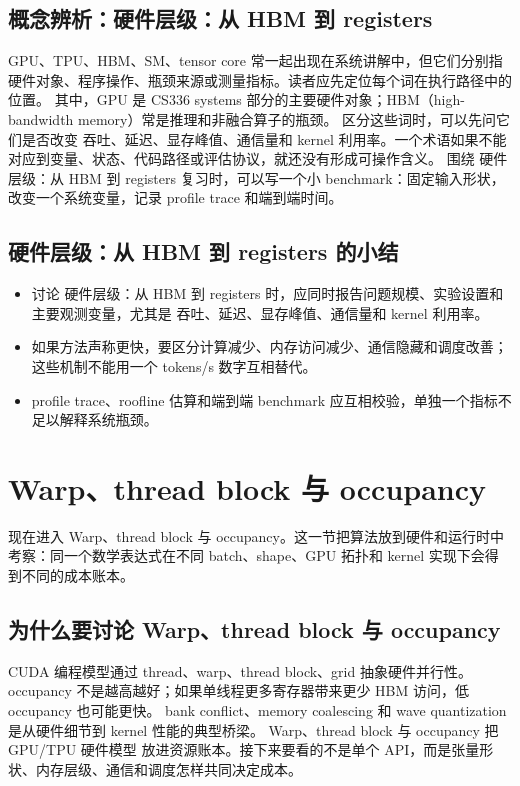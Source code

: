 \documentclass[a4paper]{article}
\begin{document}
\subsection{概念辨析：硬件层级：从 HBM 到 registers}
GPU、TPU、HBM、SM、tensor core 常一起出现在系统讲解中，但它们分别指硬件对象、程序操作、瓶颈来源或测量指标。读者应先定位每个词在执行路径中的位置。
其中，GPU 是 CS336 systems 部分的主要硬件对象；HBM（high-bandwidth memory）常是推理和非融合算子的瓶颈。
区分这些词时，可以先问它们是否改变 吞吐、延迟、显存峰值、通信量和 kernel 利用率。一个术语如果不能对应到变量、状态、代码路径或评估协议，就还没有形成可操作含义。
围绕 硬件层级：从 HBM 到 registers 复习时，可以写一个小 benchmark：固定输入形状，改变一个系统变量，记录 profile trace 和端到端时间。
\subsection{硬件层级：从 HBM 到 registers 的小结}
\begin{itemize}
\item 讨论 硬件层级：从 HBM 到 registers 时，应同时报告问题规模、实验设置和主要观测变量，尤其是 吞吐、延迟、显存峰值、通信量和 kernel 利用率。
\item 如果方法声称更快，要区分计算减少、内存访问减少、通信隐藏和调度改善；这些机制不能用一个 tokens/s 数字互相替代。
\item profile trace、roofline 估算和端到端 benchmark 应互相校验，单独一个指标不足以解释系统瓶颈。
\end{itemize}
\section{Warp、thread block 与 occupancy}
现在进入 Warp、thread block 与 occupancy。这一节把算法放到硬件和运行时中考察：同一个数学表达式在不同 batch、shape、GPU 拓扑和 kernel 实现下会得到不同的成本账本。
\subsection{为什么要讨论 Warp、thread block 与 occupancy}
CUDA 编程模型通过 thread、warp、thread block、grid 抽象硬件并行性。
occupancy 不是越高越好；如果单线程更多寄存器带来更少 HBM 访问，低 occupancy 也可能更快。
bank conflict、memory coalescing 和 wave quantization 是从硬件细节到 kernel 性能的典型桥梁。
Warp、thread block 与 occupancy 把 GPU/TPU 硬件模型 放进资源账本。接下来要看的不是单个 API，而是张量形状、内存层级、通信和调度怎样共同决定成本。
\end{document}
